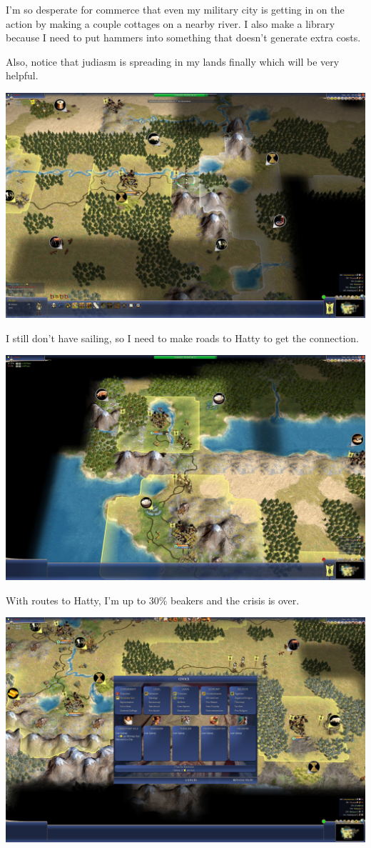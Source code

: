 \documentclass[10pt]{article}
\begin{document}
I'm so desperate for commerce that even my military city is getting in on the action by making
a couple cottages on a nearby river. I also make a library because I need to put hammers into
something that doesn't generate extra costs.

Also, notice that judiasm is spreading in my lands finally which will be very helpful.

\includegraphics[width=1.0\textwidth]{78}

I still don't have sailing, so I need to make roads to Hatty to get the connection.

\includegraphics[width=1.0\textwidth]{80}

With routes to Hatty, I'm up to 30\% beakers and the crisis is over.

\includegraphics[width=1.0\textwidth]{81}
\end{document}
